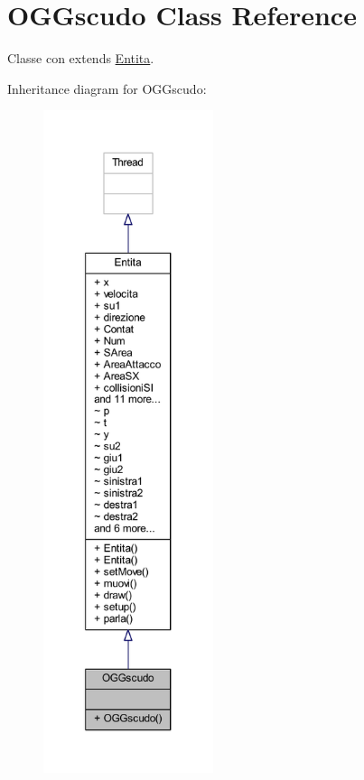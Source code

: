 \hypertarget{classoggetti_1_1_o_g_gscudo}{}\section{O\+G\+Gscudo Class Reference}
\label{classoggetti_1_1_o_g_gscudo}


Classe con extends \hyperlink{namespace_entita}{Entita}.  




Inheritance diagram for O\+G\+Gscudo\+:
\nopagebreak
\begin{figure}[H]
\begin{center}
\leavevmode
\includegraphics[height=550pt]{classoggetti_1_1_o_g_gscudo__inherit__graph}
\end{center}
\end{figure}


